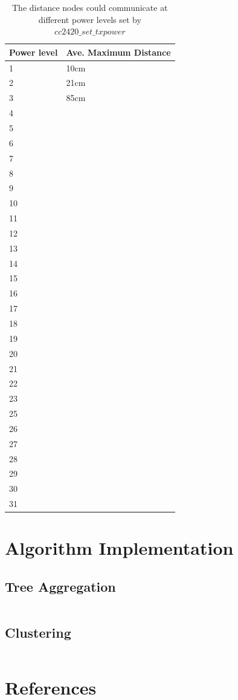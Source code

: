 \documentclass[a4paper,notitlepage]{article}
\begin{document}
\begin{table}[H]
	\centering
	\begin{tabular}{ | l | l | }
		\hline
		Power level & Ave. Maximum Distance \\
		\hline
		1 & 10cm \\
		2 & 21cm \\
		3 & 85cm \\
		4 & ~ \\
		5 & ~ \\
		6 & ~ \\
		7 & ~ \\
		8 & ~ \\
		9 & ~ \\
		10 & ~ \\
		11 & ~ \\
		12 & ~ \\
		13 & ~ \\
		14 & ~ \\
		15 & ~ \\
		16 & ~ \\
		17 & ~ \\
		18 & ~ \\
		19 & ~ \\
		20 & ~ \\
		21 & ~ \\
		22 & ~ \\
		23 & ~ \\
		25 & ~ \\
		26 & ~ \\
		27 & ~ \\
		28 & ~ \\
		29 & ~ \\
		30 & ~ \\
		31 & ~ \\
		\hline
	\end{tabular}
	\caption{The distance nodes could communicate at different power levels set by $cc2420\_set\_txpower$}
\end{table}

\newpage

\section{Algorithm Implementation}

\subsection{Tree Aggregation}

\inputminted[linenos=true,tabsize=3,fontsize=\small]{c}{../Samples/TreeAggregator/tree-aggregator.c}

\subsection{Clustering}

\inputminted[linenos=true,tabsize=3,fontsize=\small]{c}{../Samples/Clustering/cluster.c}

\newpage



\section{References}
\renewcommand{\refname}{\vspace{-1cm}}


\end{document}
